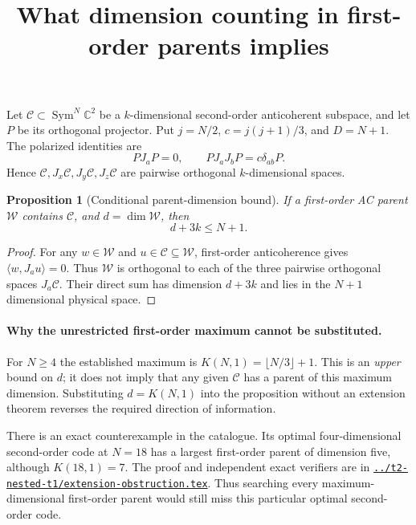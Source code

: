 \documentclass[11pt]{article}
\newtheorem{proposition}{Proposition}
\begin{document}
\title{What dimension counting in first-order parents implies}
\author{}\date{}\maketitle

Let $\mathcal C\subset\operatorname{Sym}^N\mathbb C^2$ be a
$k$-dimensional second-order anticoherent subspace, and let $P$ be its
orthogonal projector. Put $j=N/2$, $c=j(j+1)/3$, and $D=N+1$.
The polarized identities are
\[
 PJ_aP=0,\qquad PJ_aJ_bP=c\delta_{ab}P.
\]
Hence $\mathcal C,J_x\mathcal C,J_y\mathcal C,J_z\mathcal C$ are
pairwise orthogonal $k$-dimensional spaces.

\begin{proposition}[Conditional parent-dimension bound]
If a first-order AC parent $\mathcal W$ contains $\mathcal C$, and
$d=\dim\mathcal W$, then
\[
 \boxed{d+3k\le N+1.}
\]
\end{proposition}
\begin{proof}
For any $w\in\mathcal W$ and $u\in\mathcal C\subseteq\mathcal W$,
first-order anticoherence gives $\langle w,J_a u\rangle=0$.
Thus $\mathcal W$ is orthogonal to each of the three pairwise orthogonal
spaces $J_a\mathcal C$. Their direct sum has dimension $d+3k$ and lies
in the $N+1$ dimensional physical space.
\end{proof}

\paragraph{Why the unrestricted first-order maximum cannot be substituted.}
For $N\ge4$ the established maximum is
$K(N,1)=\lfloor N/3\rfloor+1$. This is an \emph{upper} bound on $d$;
it does not imply that any given $\mathcal C$ has a parent of this
maximum dimension. Substituting $d=K(N,1)$ into the proposition without
an extension theorem reverses the required direction of information.

There is an exact counterexample in the catalogue. Its optimal
four-dimensional second-order code at $N=18$ has a largest first-order
parent of dimension five, although $K(18,1)=7$. The proof and independent
exact verifiers are in
\href{../t2-nested-t1/extension-obstruction.tex}{\texttt{../t2-nested-t1/extension-obstruction.tex}}.
Thus searching every maximum-dimensional first-order parent would still
miss this particular optimal second-order code.
\end{document}
